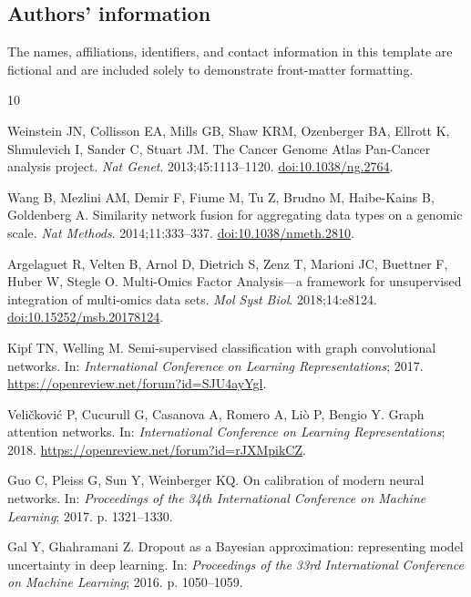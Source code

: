 \subsection*{Authors' information}
The names, affiliations, identifiers, and contact information in this template
are fictional and are included solely to demonstrate front-matter formatting.

\begin{thebibliography}{10}

Weinstein JN, Collisson EA, Mills GB, Shaw KRM, Ozenberger BA, Ellrott K,
Shmulevich I, Sander C, Stuart JM.
The Cancer Genome Atlas Pan-Cancer analysis project.
\emph{Nat Genet}. 2013;45:1113--1120.
\href{https://doi.org/10.1038/ng.2764}{doi:10.1038/ng.2764}.

Wang B, Mezlini AM, Demir F, Fiume M, Tu Z, Brudno M, Haibe-Kains B,
Goldenberg A.
Similarity network fusion for aggregating data types on a genomic scale.
\emph{Nat Methods}. 2014;11:333--337.
\href{https://doi.org/10.1038/nmeth.2810}{doi:10.1038/nmeth.2810}.

Argelaguet R, Velten B, Arnol D, Dietrich S, Zenz T, Marioni JC, Buettner F,
Huber W, Stegle O.
Multi-Omics Factor Analysis---a framework for unsupervised integration of
multi-omics data sets.
\emph{Mol Syst Biol}. 2018;14:e8124.
\href{https://doi.org/10.15252/msb.20178124}{doi:10.15252/msb.20178124}.

Kipf TN, Welling M.
Semi-supervised classification with graph convolutional networks.
In: \emph{International Conference on Learning Representations}; 2017.
\url{https://openreview.net/forum?id=SJU4ayYgl}.

Veli\v{c}kovi\'c P, Cucurull G, Casanova A, Romero A, Li\`o P, Bengio Y.
Graph attention networks.
In: \emph{International Conference on Learning Representations}; 2018.
\url{https://openreview.net/forum?id=rJXMpikCZ}.

Guo C, Pleiss G, Sun Y, Weinberger KQ.
On calibration of modern neural networks.
In: \emph{Proceedings of the 34th International Conference on Machine Learning};
2017. p. 1321--1330.

Gal Y, Ghahramani Z.
Dropout as a Bayesian approximation: representing model uncertainty in deep
learning.
In: \emph{Proceedings of the 33rd International Conference on Machine Learning};
2016. p. 1050--1059.


\end{thebibliography}
